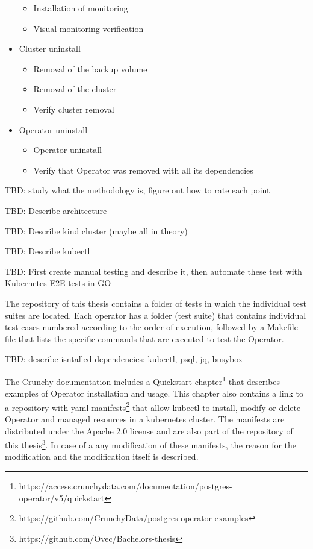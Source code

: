 \begin{itemize}
\begin{itemize}
              \item Installation of monitoring
              \item Visual monitoring verification
          \end{itemize}
    \item Cluster uninstall
          \begin{itemize}
              \item Removal of the backup volume
              \item Removal of the cluster
              \item Verify cluster removal
          \end{itemize}
    \item Operator uninstall
          \begin{itemize}
              \item Operator uninstall
              \item Verify that Operator was removed with all its dependencies
          \end{itemize}
\end{itemize}


TBD: study what the methodology is, figure out how to rate each point

TBD: Describe architecture

TBD: Describe kind cluster (maybe all in theory)

TBD: Describe kubectl

TBD: First create manual testing and describe it, then automate these test with Kubernetes E2E tests in GO

The repository of this thesis contains a folder of tests in which the individual test suites are located. Each operator has a folder (test suite) that contains individual test cases numbered according to the order of execution, followed by a Makefile file that lists the specific commands that are executed to test the Operator.

TBD: describe isntalled dependencies: kubectl, psql, jq, busybox

\pagebreak
{}
The Crunchy documentation includes a Quickstart chapter\footnote{https://access.crunchydata.com/documentation/postgres-operator/v5/quickstart} that describes examples of Operator installation and usage. This chapter also contains a link to a repository with yaml manifests\footnote{https://github.com/CrunchyData/postgres-operator-examples} that allow kubectl to install, modify or delete Operator and managed resources in a kubernetes cluster. The manifests are distributed under the Apache 2.0 license and are also part of the repository of this thesis\footnote{https://github.com/Ovec/Bachelors-thesis}. In case of a any modification of these manifests, the reason for the modification and the modification itself is described.




